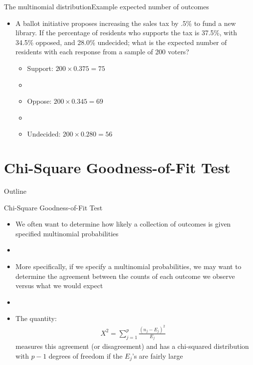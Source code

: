 \documentclass[xcolor=dvipsnames]{beamer}
\begin{document}
\begin{frame}{The multinomial distribution}{Example expected number of outcomes}
	\begin{itemize}
		\item A ballot initiative proposes increasing the sales tax by .5\% to fund a new library. If the percentage of residents who supports the tax is 37.5\%, with 34.5\% opposed, and 28.0\% undecided; what is the expected number of residents with each response from a sample of 200 voters?
		\begin{itemize}
			\item Support: $200 \times 0.375 = 75$
			\item[]
			\item Oppose: $200 \times 0.345 = 69$
			\item[]
			\item Undecided: $200 \times 0.280 = 56$
		\end{itemize}
	\end{itemize}
\end{frame}

\section{Chi-Square Goodness-of-Fit Test}
\begin{frame}{Outline}
\tableofcontents[currentsection,subsectionstyle=show/shaded/hide]
\end{frame}

\begin{frame}{Chi-Square Goodness-of-Fit Test}
	\begin{itemize}
		\item We often want to determine how likely a collection of outcomes is given specified multinomial probabilities
		\item[]
		\item More specifically, if we specify a multinomial probabilities, we may want to determine the agreement between the counts of each outcome we observe versus what we would expect
		\item[]
		\item The quantity:
		\begin{gather*}
			X^2 = \sum_{j=1}^p \frac{(n_j-E_j)^2}{E_j}
		\end{gather*}
		measures this agreement (or disagreement) and has a chi-squared distribution with $p-1$ degrees of freedom if the $E_j$'s are fairly large
	\end{itemize}
\end{frame}
\end{document}
